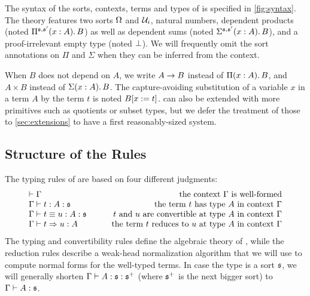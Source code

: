 The syntax of the sorts, contexts, terms and types of \SetoidCC is
specified in \cref{fig:syntax}.
%
The theory features two sorts \( \sProp \) and \( \Type_i \), natural numbers, dependent products 
(noted $\Depfunannotated{A}{B}{}{\Univ}{\Univ'}$) as well as dependent
sums (noted $\Depsumannotated{A}{B}{}{\Univ}{\Univ'}$), and a proof-irrelevant 
empty type (noted $\Empty$).
% 
We will frequently omit the sort annotations on \( \Pi \) and \( \Sigma \) when 
they can be inferred from the context.

When \( B \) does not depend on \( A \), we write \( \Fun{A}{B} \) instead of
\( \Depfun{A}{B} \), and \( A \times B \) instead of \( \Depsum{A}{B} \). The capture-avoiding
substitution of a variable \( x \) in a term \( A \) by the term \( t \) is noted
\( \subst{B}{t} \).
%
\SetoidCC can also be extended with more primitives such as quotients or subset 
types, but we defer the treatment of those to \cref{sec:extensions} to 
have a first reasonably-sized system.

\subsection{Structure of the Rules}

The typing rules of \SetoidCC are based on four different judgments: 
\[
  \begin{array}{lr}
	\wfctx{\Gamma} & \text{the context \( \Gamma \) is well-formed} \\
	\tytmannotated{\Gamma}{t}{A}{\Univ} & \text{the term \( t \) has type \( A \) in context \( \Gamma \)} \\
	\eqtmannotated{\Gamma}{t}{u}{A}{\Univ} & \text{\( t \) and \( u \) are convertible at type \( A \) in context \( \Gamma \)} \\
	\redannotated{\Gamma}{t}{u}{A} & \qquad\text{the term \( t \) reduces to \( u \) at type \( A \) in context \( \Gamma \)}
  \end{array}
\]
The typing and convertibility rules define the algebraic theory of 
\SetoidCC, while the reduction rules describe a weak-head normalization 
algorithm that we will use to compute normal forms for the well-typed 
terms.
% 
In case the type is a sort \( \Univ \), we will generally shorten 
\( \tytmannotated{\Gamma}{A}{\Univ}{\Univ^+} \) (where \( \Univ^+ \) is the next 
bigger sort) to \( \tytm{\Gamma}{A}{\Univ} \).

